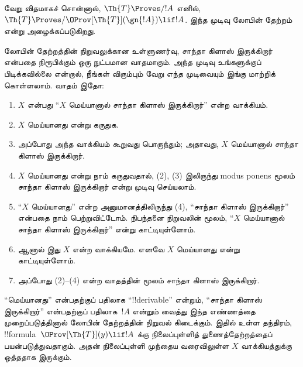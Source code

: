 \documentclass[../../../include/open-logic-section]{subfiles}
\begin{document}
வேறு விதமாகச் சொன்னால், $\Th{T} \Proves/ !A$ எனில்,
$\Th{T} \Proves/
\OProv[\Th{T}](\gn{!A}) \lif !A$. இந்த முடிவு லோபின் தேற்றம்
என்று அழைக்கப்படுகிறது.

\begin{explain}
லோபின் தேற்றத்தின் நிறுவலுக்கான உள்ளுணர்வு, சாந்தா கிளாஸ்
இருக்கிறார் என்பதை நிரூபிக்கும் ஒரு நுட்பமான வாதமாகும். அந்த முடிவு
உங்களுக்குப் பிடிக்கவில்லை என்றால், நீங்கள் விரும்பும் வேறு எந்த
முடிவையும் இங்கு மாற்றிக் கொள்ளலாம். வாதம் இதோ:
\begin{enumerate}
\item $X$ என்பது “$X$ மெய்யானால் சாந்தா கிளாஸ் இருக்கிறார்” என்ற
  வாக்கியம்.
\item $X$ மெய்யானது என்று கருதுக.
\item அப்போது அந்த வாக்கியம் கூறுவது பொருந்தும்; அதாவது, $X$ மெய்யானால் சாந்தா
  கிளாஸ் இருக்கிறார்.
\item $X$ மெய்யானது என்று நாம் கருதுவதால், (2), (3) இலிருந்து
  modus ponens மூலம் சாந்தா கிளாஸ் இருக்கிறார் என்று முடிவு செய்யலாம்.
\item “$X$ மெய்யானது” என்ற அனுமானத்திலிருந்து (4), “சாந்தா கிளாஸ்
  இருக்கிறார்” என்பதை நாம் பெற்றுவிட்டோம். நிபந்தனை நிறுவலின் மூலம்,
  “$X$ மெய்யானால் சாந்தா கிளாஸ் இருக்கிறார்” என்று காட்டியுள்ளோம்.
\item ஆனால் இது $X$ என்ற வாக்கியமே. எனவே $X$ மெய்யானது என்று
  காட்டியுள்ளோம்.
\item அப்போது (2)--(4) என்ற வாதத்தின் மூலம் சாந்தா கிளாஸ் இருக்கிறார்.
\end{enumerate}
“மெய்யானது” என்பதற்குப் பதிலாக “!!{derivable}” என்றும், “சாந்தா
கிளாஸ் இருக்கிறார்” என்பதற்குப் பதிலாக~$!A$ என்றும் வைத்து இந்த
எண்ணத்தை முறைப்படுத்தினால் லோபின் தேற்றத்தின் நிறுவல் கிடைக்கும்.
இதில் உள்ள தந்திரம், !!{formula}~$\OProv[\Th{T}](y) \lif !A$ க்கு
நிலைப்புள்ளித் துணைத்தேற்றத்தைப் பயன்படுத்துவதாகும். அதன் நிலைப்புள்ளி
முந்தைய வரைவிலுள்ள $X$ வாக்கியத்துக்கு ஒத்ததாக இருக்கும்.
\end{explain}
\end{document}
